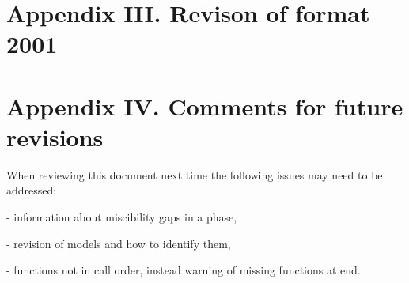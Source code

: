\documentclass[12pt]{article}
\begin{document}
\section{Appendix III. Revison of format 2001}



\section{Appendix IV. Comments for future revisions}

When reviewing this document next time the following issues may
need to be addressed:

- information about miscibility gaps in a phase,

- revision of models and how to identify them,

- functions not in call order, instead warning of missing functions at end.
\end{document}
